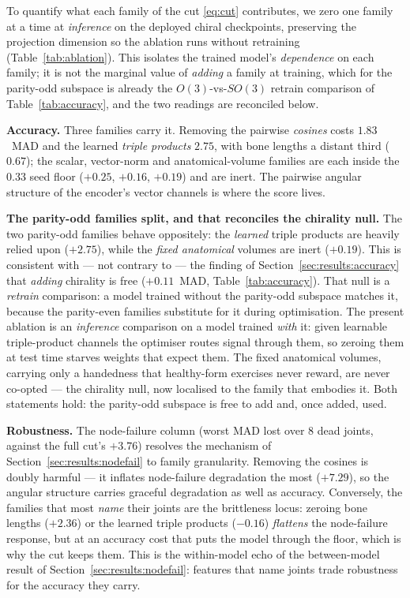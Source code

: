 \documentclass[10pt,journal]{IEEEtran}
\begin{document}
To quantify what each family of the cut \eqref{eq:cut} contributes, we zero one family at a time at
\emph{inference} on the deployed chiral checkpoints, preserving the projection dimension so the
ablation runs without retraining (Table~\ref{tab:ablation}). This isolates the trained model's
\emph{dependence} on each family; it is not the marginal value of \emph{adding} a family at training,
which for the parity-odd subspace is already the $O(3)$-vs-$SO(3)$ retrain comparison of
Table~\ref{tab:accuracy}, and the two readings are reconciled below.

\textbf{Accuracy.} Three families carry it. Removing the pairwise \emph{cosines} costs $1.83$~MAD and
the learned \emph{triple products} $2.75$, with bone lengths a distant third ($0.67$); the scalar,
vector-norm and anatomical-volume families are each inside the $0.33$ seed floor ($+0.25$, $+0.16$,
$+0.19$) and are inert. The pairwise angular structure of the encoder's vector channels is where the
score lives.

\textbf{The parity-odd families split, and that reconciles the chirality null.} The two parity-odd
families behave oppositely: the \emph{learned} triple products are heavily relied upon ($+2.75$),
while the \emph{fixed anatomical} volumes are inert ($+0.19$). This is consistent with --- not
contrary to --- the finding of Section~\ref{sec:results:accuracy} that \emph{adding} chirality is
free ($+0.11$~MAD, Table~\ref{tab:accuracy}). That null is a \emph{retrain} comparison: a model
trained without the parity-odd subspace matches it, because the parity-even families substitute for it
during optimisation. The present ablation is an \emph{inference} comparison on a model trained
\emph{with} it: given learnable triple-product channels the optimiser routes signal through them, so
zeroing them at test time starves weights that expect them. The fixed anatomical volumes, carrying
only a handedness that healthy-form exercises never reward, are never co-opted --- the chirality null,
now localised to the family that embodies it. Both statements hold: the parity-odd subspace is free to
add and, once added, used.

\textbf{Robustness.} The node-failure column (worst MAD lost over $8$ dead joints, against the full
cut's $+3.76$) resolves the mechanism of Section~\ref{sec:results:nodefail} to family granularity.
Removing the cosines is doubly harmful --- it inflates node-failure degradation the most ($+7.29$), so
the angular structure carries graceful degradation as well as accuracy. Conversely, the families that
most \emph{name} their joints are the brittleness locus: zeroing bone lengths ($+2.36$) or the learned
triple products ($-0.16$) \emph{flattens} the node-failure response, but at an accuracy cost that puts
the model through the floor, which is why the cut keeps them. This is the within-model echo of the
between-model result of Section~\ref{sec:results:nodefail}: features that name joints trade robustness
for the accuracy they carry.
\end{document}
